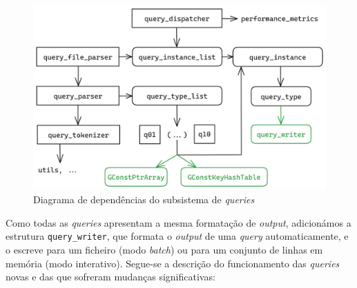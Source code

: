 \documentclass[11pt, a4paper]{article}
\begin{document}
\begin{figure}[ht]
    \centering
    \includegraphics[scale=0.17]{res-fase2/queries.png}
    \caption{Diagrama de dependências do subsistema de \emph{queries}}
    \label{fig:queries}
\end{figure}

Como todas as \emph{queries} apresentam a mesma formatação de \emph{output}, adicionámos a estrutura
\texttt{query\_writer}, que formata o \emph{output} de uma \emph{query} automaticamente, e o
escreve para um ficheiro (modo \emph{batch}) ou para um conjunto de linhas em memória (modo
interativo). Segue-se a descrição do funcionamento das \emph{queries} novas e das que sofreram
mudanças significativas:
\end{document}
